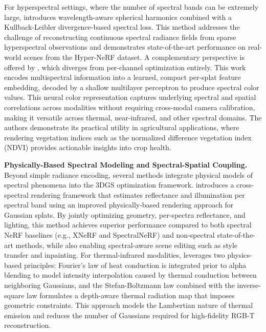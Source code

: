 \documentclass[11pt]{article}
\begin{document}
For hyperspectral settings, where the number of spectral bands can be extremely large, \cite{ref616} introduces wavelength-aware spherical harmonics combined with a Kullback-Leibler divergence-based spectral loss. This method addresses the challenge of reconstructing continuous spectral radiance fields from sparse hyperspectral observations and demonstrates state-of-the-art performance on real-world scenes from the Hyper-NeRF dataset. A complementary perspective is offered by \cite{ref617}, which diverges from per-channel optimization entirely. This work encodes multispectral information into a learned, compact per-splat feature embedding, decoded by a shallow multilayer perceptron to produce spectral color values. This neural color representation captures underlying spectral and spatial correlations across modalities without requiring cross-modal camera calibration, making it versatile across thermal, near-infrared, and other spectral domains. The authors demonstrate its practical utility in agricultural applications, where rendering vegetation indices such as the normalized difference vegetation index (NDVI) provides actionable insights into crop health.

\textbf{Physically-Based Spectral Modeling and Spectral-Spatial Coupling.} Beyond simple radiance encoding, several methods integrate physical models of spectral phenomena into the 3DGS optimization framework. \cite{ref618} introduces a cross-spectral rendering framework that estimates reflectance and illumination per spectral band using an improved physically-based rendering approach for Gaussian splats. By jointly optimizing geometry, per-spectra reflectance, and lighting, this method achieves superior performance compared to both spectral NeRF baselines (e.g., XNeRF and SpectralNeRF) and non-spectral state-of-the-art methods, while also enabling spectral-aware scene editing such as style transfer and inpainting. For thermal-infrared modalities, \cite{ref619} leverages two physics-based principles: Fourier's law of heat conduction is integrated prior to alpha blending to model intensity interpolation caused by thermal conduction between neighboring Gaussians, and the Stefan-Boltzmann law combined with the inverse-square law formulates a depth-aware thermal radiation map that imposes geometric constraints. This approach models the Lambertian nature of thermal emission and reduces the number of Gaussians required for high-fidelity RGB-T reconstruction.
\end{document}
